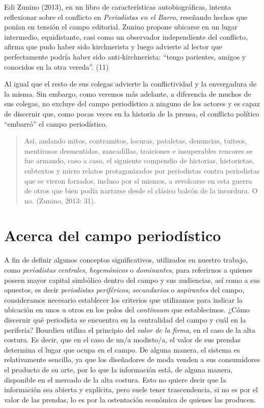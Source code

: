 Edi Zunino (2013), en un libro de características autobiográficas, intenta reflexionar sobre el conflicto en \emph{Periodistas en el Barro}, reseñando hechos que ponían en tensión el campo editorial. Zunino propone ubicarse en un lugar intermedio, equidistante, casi como un observador independiente del conflicto, afirma que pudo haber sido kirchnerista y luego advierte al lector que perfectamente podría haber sido anti-kirchnerista: ``tengo parientes, amigos y conocidos en la otra vereda''. (11)

Al igual que el resto de sus colegas advierte la conflictividad y la envergadura de la misma. Sin embargo, como veremos más adelante, a diferencia de muchos de sus colegas, no excluye del campo periodístico a ninguno de los actores y es capaz de discernir que, como pocas veces en la historia de la prensa, el conflicto político ``embarró'' el campo periodístico.

\begin{quote}
Así, andando mitos, contramitos, locuras, pataletas, denuncias, tuiteos, mentirosas desmentidas, zancadillas, traiciones e insuperables rencores se fue armando, caso a caso, el siguiente compendio de historias, historietas, subtextos y micro relatos protagonizados por periodistas contra periodistas que se vieron forzados, incluso por sí mismos, a revolcarse en esta guerra de otros que bien podía narrarse desde el clásico balcón de la incordura. O no. (Zunino, 2013: 31).
\end{quote}

\section{Acerca del campo periodístico}

A fin de definir algunos conceptos significativos, utilizados en nuestro trabajo, como \emph{periodistas centrales}, \emph{hegemónicos} o \emph{dominantes}, para referirnos a quienes poseen mayor capital simbólico dentro del campo y sus audiencias, así como a sus opuestos, es decir \emph{periodistas periféricos}, \emph{secundarios} o \emph{aspirantes} del campo, consideramos necesario establecer los criterios que utilizamos para indicar la ubicación en unos u otros en los polos del \emph{continuum} que establecimos. ¿Cómo discernir qué periodista se encuentra en la centralidad del campo y cuál en la periferia? Bourdieu utiliza el principio del \emph{valor de la firma}, en el caso de la alta costura. Es decir, que en el caso de un/a modisto/a, el valor de sus prendas determina el lugar que ocupa en el campo. De alguna manera, el sistema es relativamente sencillo, ya que los diseñadores de moda venden a sus consumidores el producto de su arte, por lo que la información está, de alguna manera, disponible en el mercado de la alta costura. Esto no quiere decir que la información sea abierta y explícita, pero suele tener trascendencia, si no es por el valor de las prendas, lo es por la ostentación económica de quienes las producen.

